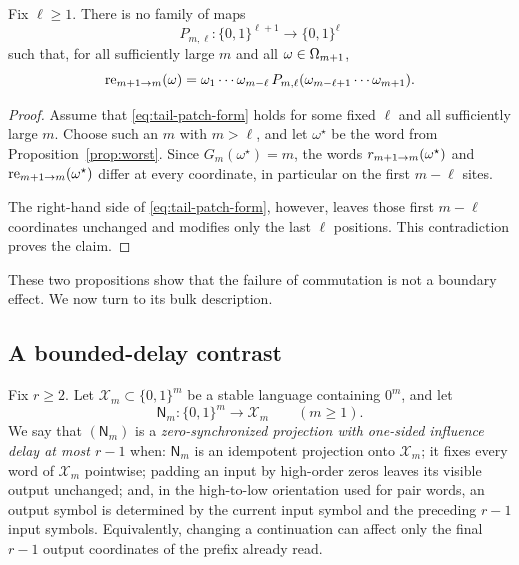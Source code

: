 \begin{proposition}\label{prop:tail-patch}
Fix \(\ell\ge 1\). There is no family of maps
\[
P_{m,\ell}:\{0,1\}^{\ell+1}\to \{0,1\}^{\ell}
\]
such that, for all sufficiently large \(m\) and all \(\omega\in \Omega_{m+1}\),
\begin{equation}\label{eq:tail-patch-form}
\mathrm{re}_{m+1\to m}(\omega)
=
\omega_1\cdots \omega_{m-\ell}\,
P_{m,\ell}(\omega_{m-\ell+1}\cdots \omega_{m+1}).
\end{equation}
\end{proposition}

\begin{proof}
Assume that \eqref{eq:tail-patch-form} holds for some fixed \(\ell\) and all sufficiently large \(m\). Choose such an \(m\) with \(m>\ell\), and let \(\omega^\star\) be the word from Proposition~\ref{prop:worst}. Since \(G_m(\omega^\star)=m\), the words \(r_{m+1\to m}(\omega^\star)\) and \(\mathrm{re}_{m+1\to m}(\omega^\star)\) differ at every coordinate, in particular on the first \(m-\ell\) sites.

The right-hand side of \eqref{eq:tail-patch-form}, however, leaves those first \(m-\ell\) coordinates unchanged and modifies only the last \(\ell\) positions. This contradiction proves the claim.
\end{proof}

These two propositions show that the failure of commutation is not a boundary effect. We now turn to its bulk description.

\subsection{A bounded-delay contrast}

Fix \(r\ge2\). Let \(\mathcal X_m\subset\{0,1\}^m\) be a stable language containing \(0^m\), and let
\[
\mathsf N_m:\{0,1\}^m\longrightarrow\mathcal X_m
\qquad(m\ge1).
\]
We say that \((\mathsf N_m)\) is a \emph{zero-synchronized projection with one-sided influence delay at most \(r-1\)} when: \(\mathsf N_m\) is an idempotent projection onto \(\mathcal X_m\); it fixes every word of \(\mathcal X_m\) pointwise; padding an input by high-order zeros leaves its visible output unchanged; and, in the high-to-low orientation used for pair words, an output symbol is determined by the current input symbol and the preceding \(r-1\) input symbols. Equivalently, changing a continuation can affect only the final \(r-1\) output coordinates of the prefix already read.

